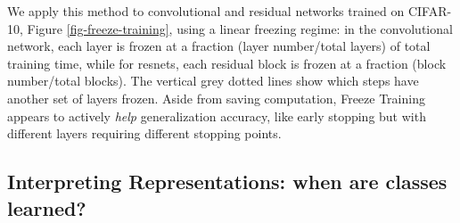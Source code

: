 \documentclass{article} %
\begin{document}
 We apply this method to convolutional and residual networks trained on CIFAR-10, Figure \ref{fig-freeze-training}, using a linear freezing regime: in the convolutional network, each layer is frozen at a fraction (layer number/total layers) of total training time, while for resnets, each residual block is frozen at a fraction (block number/total blocks). The vertical grey dotted lines show which steps have another set of layers frozen. Aside from saving computation,
 Freeze Training appears to actively \textit{help} generalization accuracy, like early stopping but with different layers requiring different stopping points.
 
 \subsection{Interpreting Representations: when are classes learned?}
\end{document}
